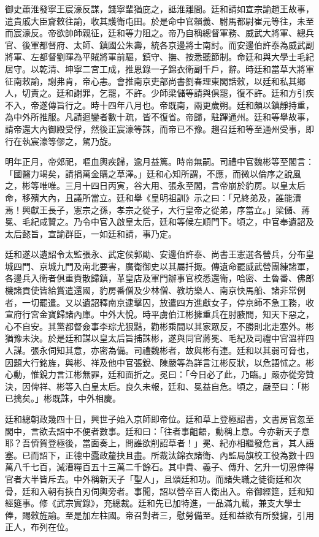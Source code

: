 \begin{pinyinscope}
御史蕭淮發寧王宸濠反謀，錢寧輩猶庇之，詆淮離間。廷和請如宣宗諭趙王故事，遣貴戚大臣齎敕往諭，收其護衛屯田。於是命中官賴義、駙馬都尉崔元等往，未至而宸濠反。帝欲帥師親征，廷和等力阻之。帝乃自稱總督軍務、威武大將軍、總兵官、後軍都督府、太師、鎮國公朱壽，統各京邊將士南討。而安邊伯許泰為威武副將軍、左都督劉暉為平賊將軍前驅，鎮守、撫、按悉聽節制。命廷和與大學士毛紀居守。以乾清、坤寧二宮工成，推恩錄一子錦衣衛副千戶，辭。時廷和當草大將軍征南敕諭，謝弗肯，帝心恚。會推南京吏部尚書劉春理東閣誥敕，以廷和私其鄉人，切責之。廷和謝罪，乞罷，不許。少師梁儲等請與俱罷，復不許。廷和方引疾不入，帝遂傳旨行之。時十四年八月也。帝既南，兩更歲朔。廷和頗以鎮靜持重，為中外所推服。凡請迴鑾者數十疏，皆不復省。帝歸，駐蹕通州。廷和等舉故事，請帝還大內御殿受俘，然後正宸濠等誅，而帝已不豫。趨召廷和等至通州受事，即行在執宸濠等僇之，駕乃旋。

明年正月，帝郊祀，嘔血輿疾歸，逾月益篤。時帝無嗣。司禮中官魏彬等至閣言：「國醫力竭矣，請捐萬金購之草澤。」廷和心知所謂，不應，而微以倫序之說風之，彬等唯唯。三月十四日丙寅，谷大用、張永至閣，言帝崩於豹房。以皇太后命，移殯大內，且議所當立。廷和舉《皇明祖訓》示之曰：「兄終弟及，誰能瀆焉！興獻王長子，憲宗之孫，孝宗之從子，大行皇帝之從弟，序當立。」梁儲、蔣冕、毛紀咸贊之。乃令中官入啟皇太后，廷和等候左順門下。頃之，中官奉遺詔及太后懿旨，宣諭群臣，一如廷和請，事乃定。

廷和遂以遺詔令太監張永、武定侯郭勛、安邊伯許泰、尚書王憲選各營兵，分布皇城四門、京城九門及南北要害，廣衛御史以其屬扦掫。傳遺命罷威武營團練諸軍，各邊兵入衛者俱重賚散歸鎮，革皇店及軍門辦事官校悉還衛，哈密、土魯番、佛郎機諸貢使皆給賞遣還國，豹房番僧及少林僧、教坊樂人、南京快馬船、諸非常例者，一切罷遣。又以遺詔釋南京逮擊囚，放遣四方進獻女子，停京師不急工務，收宣府行宮金寶歸諸內庫。中外大悅。時平虜伯江彬擁重兵在肘腋間，知天下惡之，心不自安。其黨都督僉事李琮尤狠黠，勸彬乘間以其家眾反，不勝則北走塞外。彬猶豫未決。於是廷和謀以皇太后旨捕誅彬，遂與同官蔣冕、毛紀及司禮中官溫祥四人謀。張永伺知其意，亦密為備。司禮魏彬者，故與彬有連。廷和以其弱可脅也，因題大行銘旌，與彬、祥及他中官張銳、陳嚴等為詳言江彬反狀，以危語怵之。彬心動，惟銳力言江彬無罪，廷和面折之。冕曰：「今日必了此，乃臨。」嚴亦從旁贊決，因俾祥、彬等入白皇太后。良久未報，廷和、冕益自危。頃之，嚴至曰：「彬已擒矣。」彬既誅，中外相慶。

廷和總朝政幾四十日，興世子始入京師即帝位。廷和草上登極詔書，文書房官忽至閣中，言欲去詔中不便者數事。廷和曰：「往者事齟齬，動稱上意。今亦新天子意耶？吾儕賀登極後，當面奏上，問誰欲削詔草者！」冕、紀亦相繼發危言，其人語塞。已而詔下，正德中蠹政釐抉且盡。所裁汰錦衣諸衛、內監局旗校工役為數十四萬八千七百，減漕糧百五十三萬二千餘石。其中貴、義子、傳升、乞升一切恩倖得官者大半皆斥去。中外稱新天子「聖人」，且頌廷和功。而諸失職之徒銜廷和次骨，廷和入朝有挾白刃伺輿旁者。事聞，詔以營卒百人衛出入。帝御經筵，廷和知經筵事。修《武宗實錄》，充總裁。廷和先已加特進，一品滿九載，兼支大學士俸，賜敕旌諭。至是加左柱國。帝召對者三，慰勞備至。廷和益欲有所發攄，引用正人，布列在位。


\end{pinyinscope}
